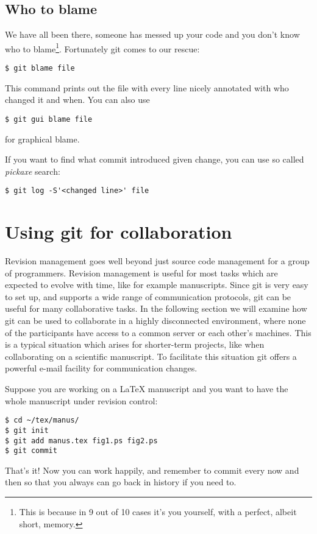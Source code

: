 \documentclass[a4paper,10pt]{article}
\begin{document}
\subsection{Who to blame}
We have all been there, someone has messed up your code and you don't know who
to blame\footnote{This is because in 9 out of 10 cases it's you yourself,
with a perfect, albeit short, memory.}.
Fortunately git comes to our rescue:
\begin{verbatim}
$ git blame file
\end{verbatim}
This command prints out the file with every line nicely annotated with who 
changed it and when.
You can also use
\begin{verbatim}
$ git gui blame file
\end{verbatim}
for graphical blame.

If you want to find what commit introduced given change, you can use
so called \emph{pickaxe} search:
\begin{verbatim}
$ git log -S'<changed line>' file
\end{verbatim}


\section{Using git for collaboration}
Revision management goes well beyond just source code management for a group
of programmers. Revision management is useful for most tasks which are
expected to evolve with time, like for example manuscripts.
Since git is very easy to set up, and supports a wide range of communication
protocols, git can be useful for many collaborative tasks. In the following
section we will examine how git can be used to collaborate in a highly
disconnected environment, where none of the participants have access to a
common server or each other's machines. This is a typical situation which
arises for shorter-term projects, like when collaborating on a scientific
manuscript. To facilitate this situation git offers a powerful e-mail facility
for communication changes.

Suppose you are working on a LaTeX manuscript and you want to have the whole
manuscript under revision control:
\begin{verbatim}
$ cd ~/tex/manus/
$ git init
$ git add manus.tex fig1.ps fig2.ps
$ git commit
\end{verbatim}
That's it! Now you can work happily, and remember to commit every now and then
so that you always can go back in history if you need to. 
\end{document}
